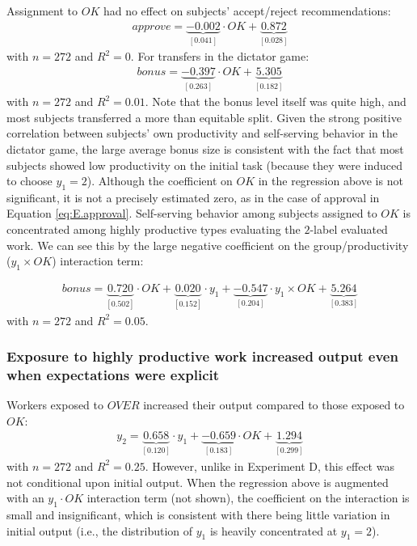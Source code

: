 \documentclass[12pt]{article}
\begin{document}
Assignment to $OK$ had no effect on subjects' accept/reject
recommendations: 
\begin{align} \label{eq:E.approval}
  approve = \underbrace{-0.002}_{[0.041]}\cdot OK + 
\underbrace{0.872}_{[0.028]}\end{align}
with $n=272$ and $R^2 = 0$. For transfers
in the dictator game: 
\begin{align}
  bonus =
  \underbrace{-0.397}_{[0.263]}\cdot OK +
  \underbrace{5.305}_{[0.182]}\end{align} with
$n=272$ and $R^2 = 0.01$.  Note that the bonus
level itself was quite high, and most subjects transferred a more than
equitable split. Given the strong positive correlation between
subjects' own productivity and self-serving behavior in the dictator
game, the large average bonus size is consistent with the fact that
most subjects showed low productivity on the initial task (because
they were induced to choose $y_1=2$). Although the coefficient on $OK$
in the regression above is not significant, it is not a precisely
estimated zero, as in the case of approval in Equation
\ref{eq:E.approval}. Self-serving behavior among subjects assigned to
$OK$ is concentrated among highly productive types evaluating the
$2$-label evaluated work. We can see this by the large negative
coefficient on the group/productivity ($y_1 \times OK$) interaction
term:

\begin{align} bonus = \underbrace{0.720}_{[0.502]}\cdot OK + 
 \underbrace{0.020}_{[0.152]}\cdot y_1 + 
 \underbrace{-0.547}_{[0.204]} \cdot y_1 \times OK + 
\underbrace{5.264}_{[0.383]}\end{align}
with $n=272$ and $R^2 = 0.05$.

\subsubsection{Exposure to highly productive work increased output even when expectations were explicit} 
Workers exposed to $OVER$ increased their output compared to those
exposed to $OK$:
\begin{align} y_2 = \underbrace{0.658}_{[0.120]} \cdot y_1 + 
 \underbrace{-0.659}_{[0.183]} \cdot OK + 
  \underbrace{1.294}_{[0.299]}  
\end{align} 
with $n = 272$ and $R^2 = 0.25$. However, unlike
in Experiment D, this effect was not conditional upon initial
output. When the regression above is augmented with an $y_1 \cdot OK$
interaction term (not shown), the coefficient on the interaction is
small and insignificant, which is consistent with there being little
variation in initial output (i.e., the distribution of $y_1$ is
heavily concentrated at $y_1=2$).
\end{document}
